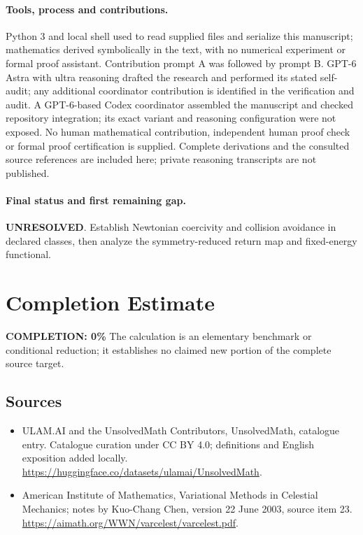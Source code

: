 \documentclass[11pt]{article}
\begin{document}
\paragraph{Tools, process and contributions.}
Python 3 and local shell used to read supplied files and serialize this manuscript; mathematics derived symbolically in the text, with no numerical experiment or formal proof assistant. Contribution prompt A was followed by prompt B. GPT-6 Astra with ultra reasoning drafted the research and performed its stated self-audit; any additional coordinator contribution is identified in the verification and audit. A GPT-6-based Codex coordinator assembled the manuscript and checked repository integration; its exact variant and reasoning configuration were not exposed. No human mathematical contribution, independent human proof check or formal proof certification is supplied. Complete derivations and the consulted source references are included here; private reasoning transcripts are not published.

\paragraph{Final status and first remaining gap.}
\textbf{UNRESOLVED}. Establish Newtonian coercivity and collision avoidance in declared classes, then analyze the symmetry-reduced return map and fixed-energy functional.

\section{Completion Estimate}
\noindent\textbf{COMPLETION: 0\%}
The calculation is an elementary benchmark or conditional reduction; it establishes no claimed new portion of the complete source target.

\subsection{Sources}
\begin{itemize}
\item[\hypertarget{source:statement:1}{S1}] ULAM.AI and the UnsolvedMath Contributors, UnsolvedMath, catalogue entry. Catalogue curation under CC BY 4.0; definitions and English exposition added locally.
\url{https://huggingface.co/datasets/ulamai/UnsolvedMath}.
\item[\hypertarget{source:statement:2}{S2}] American Institute of Mathematics, Variational Methods in Celestial Mechanics; notes by Kuo-Chang Chen, version 22 June 2003, source item 23.
\url{https://aimath.org/WWN/varcelest/varcelest.pdf}.
\end{itemize}
\label{end:statement}
\end{document}
